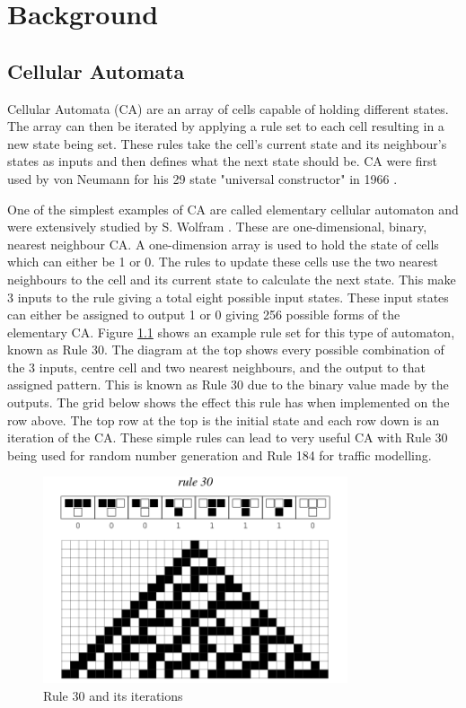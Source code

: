 \chapter{Background}
\label{ch:background}

\section{Cellular Automata}
Cellular Automata (CA) are an array of cells capable of holding different states. The array can then be iterated by applying a rule set to each cell resulting in a new state being set. These rules take the cell’s current state and its neighbour’s states as inputs and then defines what the next state should be. CA were first used by von Neumann for his 29 state "universal constructor" in 1966 \cite{VONNEUMANN1966}.

One of the simplest examples of CA are called elementary cellular automaton and were extensively studied by S. Wolfram \cite{WOLFRAM2002}. These are one\mbox{-}dimensional, binary, nearest neighbour CA. A one\mbox{-}dimension array is used to hold the state of cells which can either be 1 or 0. The rules to update these cells use the two nearest neighbours to the cell and its current state to calculate the next state. This make 3 inputs to the rule giving a total eight possible input states. These input states can either be assigned to output 1 or 0 giving 256 possible forms of the elementary CA. Figure \ref{fig:CODE30} shows an example rule set for this type of automaton, known as Rule 30. The diagram at the top shows every possible combination of the 3 inputs, centre cell and two nearest neighbours, and the output to that assigned pattern. This is known as Rule 30 due to the binary value made by the outputs. The grid below shows the effect this rule has when implemented on the row above. The top row at the top is the initial state and each row down is an iteration of the CA. These simple rules can lead to very useful CA with Rule 30 being used for random number generation and Rule 184 for traffic modelling.

\begin{figure}[h]
	\centering
	\includegraphics[width=0.8\textwidth]{ElementaryCARule030_700.png}
	\caption{Rule 30 and its iterations \cite{WOLFRAMCODE}}
	\label{fig:CODE30}
\end{figure}

